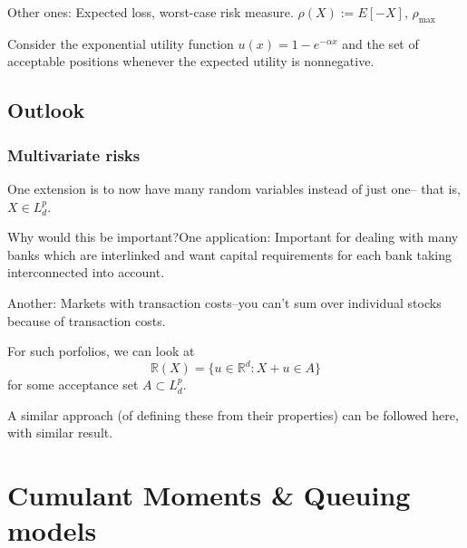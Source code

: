 Other ones: Expected loss, worst-case risk measure.
$\rho(X):=E[-X]$,
$\rho_{\max}$


Consider the exponential utility function $u(x)=1-e^{-\alpha x}$ and the set of acceptable positions whenever the expected utility is nonnegative.

\section{Outlook}
\subsection{Multivariate risks}
One extension is to now have many random variables instead of just one-- that is, $X \in L_d^p$.

Why would this be important?One application: Important for dealing with many banks which are interlinked and want capital requirements for each bank taking interconnected into account.

Another: Markets with transaction costs--you can't sum over individual stocks because of transaction costs.

For such porfolios, we can look at
\begin{equation}
	\mathbb{R}(X) = \{ u\in\mathbb{R}^d : X + u \in A \}
\end{equation}
for some acceptance set $A \subset L^p_d$.

A similar approach (of defining these from their properties) can be followed here, with similar result.

\chapter{Cumulant Moments \& Queuing models}
